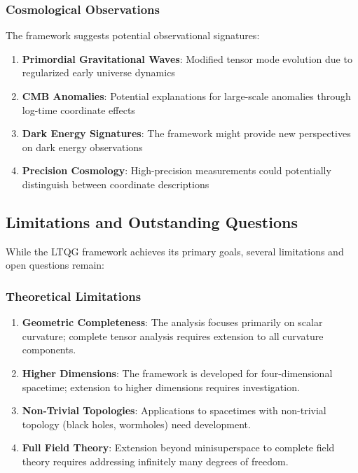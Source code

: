 \subsubsection{Cosmological Observations}

The framework suggests potential observational signatures:

\begin{enumerate}
\item \textbf{Primordial Gravitational Waves}: Modified tensor mode evolution due to regularized early universe dynamics
\item \textbf{CMB Anomalies}: Potential explanations for large-scale anomalies through log-time coordinate effects
\item \textbf{Dark Energy Signatures}: The framework might provide new perspectives on dark energy observations
\item \textbf{Precision Cosmology}: High-precision measurements could potentially distinguish between coordinate descriptions
\end{enumerate}

\subsection{Limitations and Outstanding Questions}
\label{subsec:limitations_questions}

While the LTQG framework achieves its primary goals, several limitations and open questions remain:

\subsubsection{Theoretical Limitations}

\begin{enumerate}
\item \textbf{Geometric Completeness}: The analysis focuses primarily on scalar curvature; complete tensor analysis requires extension to all curvature components.

\item \textbf{Higher Dimensions}: The framework is developed for four-dimensional spacetime; extension to higher dimensions requires investigation.

\item \textbf{Non-Trivial Topologies}: Applications to spacetimes with non-trivial topology (black holes, wormholes) need development.

\item \textbf{Full Field Theory}: Extension beyond minisuperspace to complete field theory requires addressing infinitely many degrees of freedom.
\end{enumerate}

